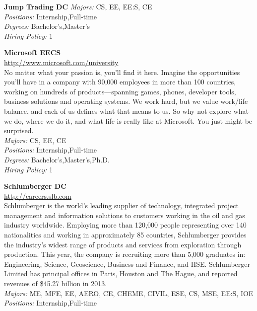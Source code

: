 \documentclass[twoside]{article}
\begin{document}
\begin{center}
\begin{multicols}{2}
\begin{minipage}{.95\columnwidth}{\Large\bf Jump Trading \hfill DC}
    \emph{Majors:} CS, EE, EE:S, CE\\
    \emph{Positions:} Internship,Full-time\\
    \emph{Degrees:} Bachelor's,Master's\\
    \emph{Hiring Policy:} 1\\
\end{minipage}
 \begin{minipage}{.95\columnwidth}{\Large\bf Microsoft \hfill EECS}\\
    \url{http://www.microsoft.com/university}\\
    No matter what your passion is, you’ll find it here. Imagine the opportunities you’ll have in a company with 90,000 employees in more than 100 countries, working on hundreds of products—spanning games, phones, developer tools, business solutions and operating systems. We work hard, but we value work/life balance, and each of us defines what that means to us. So why not explore what we do, where we do it, and what life is really like at Microsoft. You just might be surprised.\\
    \emph{Majors:} CS, EE, CE\\
    \emph{Positions:} Internship,Full-time\\
    \emph{Degrees:} Bachelor's,Master's,Ph.D.\\
    \emph{Hiring Policy:} 1\\
\end{minipage}
 \begin{minipage}{.95\columnwidth}{\Large\bf Schlumberger \hfill DC}\\
    \url{http://careers.slb.com}\\
    Schlumberger is the world’s leading supplier of technology, integrated project management and information solutions to customers working in the oil and gas industry worldwide. Employing more than 120,000 people representing over 140 nationalities and working in approximately 85 countries, Schlumberger provides the industry’s widest range of products and services from exploration through production. This year, the company is recruiting more than 5,000 graduates in: Engineering, Science, Geoscience, Business and Finance, and HSE. Schlumberger Limited has principal offices in Paris, Houston and The Hague, and reported revenues of \$45.27 billion in 2013.\\
    \emph{Majors:} ME, MFE, EE, AERO, CE, CHEME, CIVIL, ESE, CS, MSE, EE:S, IOE\\
    \emph{Positions:} Internship,Full-time\\

\end{minipage}
\end{multicols}
\end{center}
\end{document}
